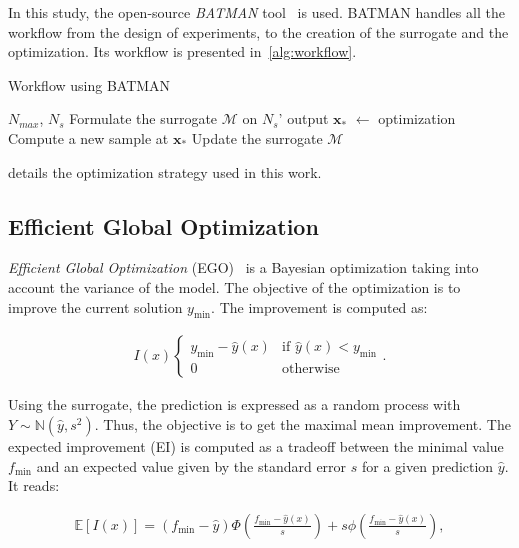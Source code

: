 In this study, the open-source \emph{BATMAN} tool~\cite{roy2018} is used. BATMAN handles all the workflow from the design of experiments, to the creation of the surrogate and the optimization. Its workflow is presented in~\cref{alg:workflow}.

\begin{algorithm}
  \caption{Workflow using BATMAN}
  \label{alg:workflow}
  \begin{algorithmic}[1]
  \Require $N_{max}$, $N_s$
  \State Formulate the surrogate $\mathcal{M}$ on $N_s$' output
    \State $\mathbf{x_{*}}$ $\gets$ optimization
    \State Compute a new sample at $\mathbf{x_{*}}$
    \State Update the surrogate $\mathcal{M}$
  \EndWhile
  \end{algorithmic}
\end{algorithm}

 details the optimization strategy used in this work.


\subsection{Efficient Global Optimization}
\label{sec:EGO}

\emph{Efficient Global Optimization} (EGO)~\cite{jones1998} is a Bayesian optimization taking into account the variance of the model. The objective of the optimization is to improve the current solution $y_{\min}$. The improvement is computed as:

\begin{align}
I(x) \left\{\begin{array}{rcl} y_{\min} - \hat{y}(x) & \text{if } \hat{y}(x) < y_{\min} \\ 0   & \text{otherwise} \end{array}\right. .
\end{align}

Using the surrogate, the prediction is expressed as a random process with $Y\sim \mathbb{N}(\hat{y}, s^2)$. Thus, the objective is to get the maximal mean improvement. The expected improvement (EI) is computed as a tradeoff between the minimal value $f_{\min}$ and an expected value given by the standard error $s$ for a given prediction $\hat{y}$. It reads:

\begin{align}
\mathbb{E}[I(x)] = (f_{\min} - \hat{y})\Phi \left( \frac{f_{\min} - \hat{y}(x)}{s} \right) + s\phi \left( \frac{f_{\min} - \hat{y}(x)}{s} \right), 
\end{align}

